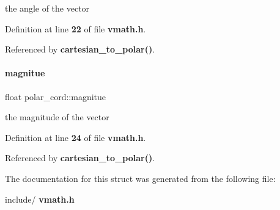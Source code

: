the angle of the vector 



Definition at line \textbf{ 22} of file \textbf{ vmath.\+h}.



Referenced by \textbf{ cartesian\+\_\+to\+\_\+polar()}.

\mbox{\label{a00195_aec2e25fecc82af176f0fcd23f1e02f0c}} 
\paragraph{magnitue}
{\footnotesize\ttfamily float polar\+\_\+cord\+::magnitue}



the magnitude of the vector 



Definition at line \textbf{ 24} of file \textbf{ vmath.\+h}.



Referenced by \textbf{ cartesian\+\_\+to\+\_\+polar()}.



The documentation for this struct was generated from the following file\+:\begin{DoxyCompactItemize}
\item 
include/\textbf{ vmath.\+h}\end{DoxyCompactItemize}
